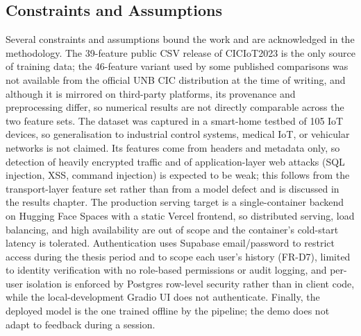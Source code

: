 \subsection{Constraints and Assumptions}
\label{subsec:constraints}

\par Several constraints and assumptions bound the work and are acknowledged in the methodology. The 39-feature public CSV release of CICIoT2023 is the only source of training data; the 46-feature variant used by some published comparisons was not available from the official UNB CIC distribution at the time of writing, and although it is mirrored on third-party platforms, its provenance and preprocessing differ, so numerical results are not directly comparable across the two feature sets. The dataset was captured in a smart-home testbed of 105 IoT devices, so generalisation to industrial control systems, medical IoT, or vehicular networks is not claimed. Its features come from headers and metadata only, so detection of heavily encrypted traffic and of application-layer web attacks (SQL injection, XSS, command injection) is expected to be weak; this follows from the transport-layer feature set rather than from a model defect and is discussed in the results chapter. The production serving target is a single-container backend on Hugging Face Spaces with a static Vercel frontend, so distributed serving, load balancing, and high availability are out of scope and the container's cold-start latency is tolerated. Authentication uses Supabase email/password to restrict access during the thesis period and to scope each user's history (FR-D7), limited to identity verification with no role-based permissions or audit logging, and per-user isolation is enforced by Postgres row-level security rather than in client code, while the local-development Gradio UI does not authenticate. Finally, the deployed model is the one trained offline by the pipeline; the demo does not adapt to feedback during a session.
